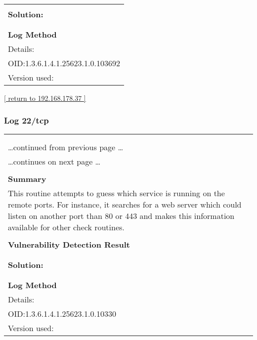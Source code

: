 \documentclass{article}
\begin{document}
\begin{longtable}{|p{}|}
          \hline
          \\
\textbf{Solution:}\\
\\


        \hline
        \\
\textbf{Log Method}\\
Details:
\rowcolor{white}{\verb=SSL/TLS: Collect and Report Certificate Details=}\\
OID:1.3.6.1.4.1.25623.1.0.103692\\
Version used:
\rowcolor{white}{\verb=2021-12-10T12:48:00Z=}\\
\end{longtable}

\begin{footnotesize}\hyperref[host:192.168.178.37]{[ return to 192.168.178.37 ]}\end{footnotesize}
\subsubsection{Log 22/tcp}
\label{port:192.168.178.37 22/tcp Log}

\begin{longtable}{|p{}|}
\hline
\rowcolor{gvm_log}{\color{white}{Log (CVSS: 0.0) }}\\
\rowcolor{gvm_log}{\color{white}{NVT: Services}}\\
\hline
\endfirsthead
\hfill\ldots continued from previous page \ldots \\
\hline
\endhead
\hline
\ldots continues on next page \ldots \\
\endfoot
\hline
\endlastfoot
\\
\textbf{Summary}\\
This routine attempts to guess which service is running on the
  remote ports. For instance, it searches for a web server which could listen on another port than
  80 or 443 and makes this information available for other check routines.\\

        \hline
        \\
\textbf{Vulnerability Detection Result}\\
\rowcolor{white}{\verb=An ssh server is running on this port=}\\

          \hline
          \\
\textbf{Solution:}\\
\\


        \hline
        \\
\textbf{Log Method}\\
Details:
\rowcolor{white}{\verb=Services=}\\
OID:1.3.6.1.4.1.25623.1.0.10330\\
Version used:
\rowcolor{white}{\verb=2021-03-15T10:42:03Z=}\\
\end{longtable}
\end{document}
